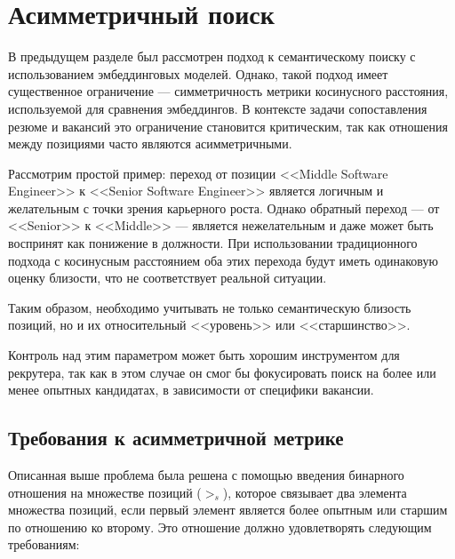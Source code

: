 \documentclass[14pt]{mmcs_article}
\begin{document}
\newpage
\section{Асимметричный поиск}\label{assymetric_search}

В предыдущем разделе был рассмотрен подход к семантическому поиску с использованием эмбеддинговых моделей. Однако, такой подход имеет существенное ограничение --- симметричность метрики косинусного расстояния, используемой для сравнения эмбеддингов. В контексте задачи сопоставления резюме и вакансий это ограничение становится критическим, так как отношения между позициями часто являются асимметричными.

Рассмотрим простой пример: переход от позиции <<Middle Software Engineer>> к <<Senior Software Engineer>> является логичным и желательным с точки зрения карьерного роста. Однако обратный переход --- от <<Senior>> к <<Middle>> --- является нежелательным и даже может быть воспринят как понижение в должности. При использовании традиционного подхода с косинусным расстоянием оба этих перехода будут иметь одинаковую оценку близости, что не соответствует реальной ситуации.

Таким образом, необходимо учитывать не только семантическую близость позиций, но и их относительный <<уровень>> или <<старшинство>>.

Контроль над этим параметром может быть хорошим инструментом для рекрутера, так как в этом случае он смог бы фокусировать поиск на более или менее опытных кандидатах, в зависимости от специфики вакансии.

\subsection{Требования к асимметричной метрике}

Описанная выше проблема была решена с помощью введения бинарного отношения на множестве позиций ($>_{s}$), которое связывает два элемента множества позиций, если первый элемент является более опытным или старшим по отношению ко второму. Это отношение должно удовлетворять следующим требованиям:
\end{document}
